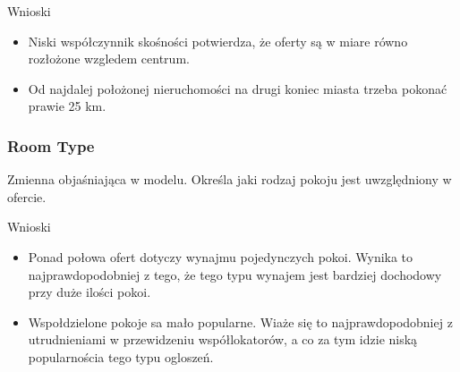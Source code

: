 
Wnioski

\begin{itemize}
    \item Niski współczynnik skośności potwierdza, że oferty są w miare równo rozłożone wzgledem centrum.
    \item Od najdalej położonej nieruchomości na drugi koniec miasta trzeba pokonać prawie 25 km.
\end{itemize}

\subsubsection{Room Type}\label{subsubsec:room-type}
Zmienna objaśniająca w modelu.
Określa jaki rodzaj pokoju jest uwzględniony w ofercie.


Wnioski

\begin{itemize}
    \item Ponad połowa ofert dotyczy wynajmu pojedynczych pokoi.
    Wynika to najprawdopodobniej z tego, że tego typu wynajem jest bardziej dochodowy przy duże ilości pokoi.
    \item Wspołdzielone pokoje sa mało popularne.
    Wiaże się to najprawdopodobniej z utrudnieniami w przewidzeniu współlokatorów, a co za tym idzie niską popularnościa tego typu ogloszeń.
\end{itemize}
